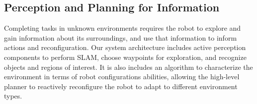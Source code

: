 \documentclass[12pt]{article}
\begin{document}
\subsection{Perception and Planning for Information}
\label{sec:exploration}
%



Completing tasks in unknown environments requires the robot to explore and gain information about its surroundings, and use that information to inform actions and reconfiguration.
Our system architecture includes active perception components to perform SLAM, choose waypoints for exploration, and recognize objects and regions of interest.  It is also includes an algorithm to characterize the environment in terms of robot configurations abilities, allowing the high-level planner to reactively reconfigure the robot to adapt to different environment types.
\end{document}
